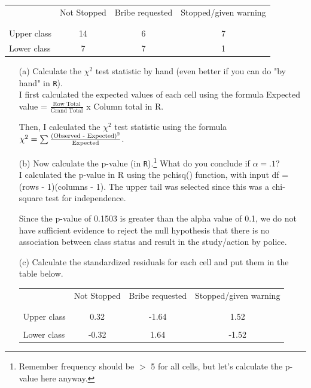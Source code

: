 \documentclass[12pt,letterpaper]{article}
\begin{document}
\newpage
\begin{table}[h!]
	\centering
	\begin{tabular}{l | c c c }
		& Not Stopped & Bribe requested & Stopped/given warning \\
		\\[-1.8ex] 
		\hline \\[-1.8ex]
		Upper class & 14 & 6 & 7 \\
		Lower class & 7 & 7 & 1 \\
		\hline
	\end{tabular}
\end{table}

\begin{enumerate}
	
	\item [(a)]
	Calculate the $\chi^2$ test statistic by hand (even better if you can do "by hand" in \texttt{R}).\\
	
		I first calculated the expected values of each cell using the formula Expected value = $\frac{\text{Row Total}}{\text{Grand Total}}$ x Column total in R.	
	  
	
	Then, I calculated the $\chi^2$ test statistic using the formula $\chi^2 = \sum\frac{\text{(Observed - Expected)\textsuperscript{2}}}{\text{Expected}}$.
	 
	
	\item [(b)]
	Now calculate the p-value (in \texttt{R}).\footnote{Remember frequency should be $>$ 5 for all cells, but let's calculate the p-value here anyway.}  What do you conclude if $\alpha = .1$?\\
	
		I calculated the p-value in R using the pchisq() function, with input df = (rows - 1)(columns - 1). The upper tail was selected since this was a chi-square test for independence.
	
	 
	Since the p-value of 0.1503 is greater than the alpha value of 0.1, we do not have sufficient evidence to reject the null hypothesis that there is no association between class status and result in the study/action by police.
	
	\item [(c)] Calculate the standardized residuals for each cell and put them in the table below.
	\vspace{1cm}
	\begin{table}[h]
		\centering
		\begin{tabular}{l | c c c }
			& Not Stopped & Bribe requested & Stopped/given warning \\
			\\[-1.8ex] 
			\hline \\[-1.8ex]
				Upper class  & 0.32  & -1.64 & 1.52 \\
\\
Lower class &-0.32  & 1.64   & -1.52  \\
			

\end{tabular}
\end{table}
\end{enumerate}
\end{document}

